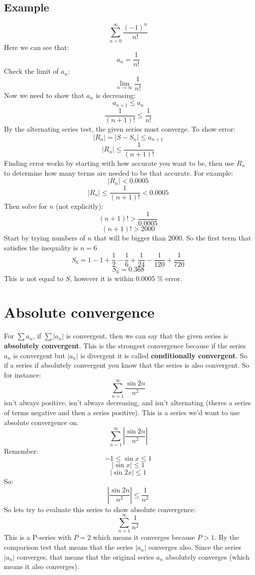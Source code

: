 \documentclass{report}
\begin{document}
    \subsection{Example}
        \[\sum_{n = 0}^{\infty} \frac{(-1)^n}{n!}\]
        Here we can see that:
        \[a_n = \frac{1}{n!}\]
        Check the limit of \(a_n\):
        \[\lim_{n \to \infty} \frac{1}{n!} \]
        Now we need to show that \(a_n\) is decreasing:
        \[a_{n+1} \leq a_n\]
        \[\frac{1}{(n+1)!} \leq \frac{1}{n!}\]
        By the alternating series test, the given series must converge. To show error:
        \[|R_n| = |S - S_n| \leq a_{n+1}\]
        \[|R_n| \leq \frac{1}{(n+1)!}\]
        Finding error works by starting with how accurate you want to be, then use \(R_n\) to determine how many terms are needed to be that accurate. For example:
        \[|R_n| < 0.0005\]
        \[|R_n| \leq \frac{1}{(n+1)!} < 0.0005\]
        Then solve for \(n\) (not explicitly):
        \[(n+1)! > \frac{1}{0.0005}\]
        \[(n+1)! > 2000\]
        Start by trying numbers of \(n\) that will be bigger than 2000. So the first term that satisfies the inequality is \(n = 6\)
        \[S_6 = 1 - 1 + \frac{1}{2} - \frac{1}{6} + \frac{1}{24} - \frac{1}{120}+ \frac{1}{720}\]
        \[S_6 = 0.368\]
        This is not equal to \(S\), however it is within 0.0005 \% error.

\section{Absolute convergence}
    For \(\sum a_n\), if \(\sum |a_n|\) is convergent, then we can say that the given series is \textbf{absolutely convergent}. This is the strongest convergence because
    if the series \(a_n\) is convergent but \(|a_n|\) is divergent it is called \textbf{conditionally convergent}. So if a series if absolutely convergent
    you know that the series is also convergent.
    So for instance:
    \[\sum_{n = 1}^{\infty} \frac{\sin 2n}{n^2}\]
    isn't always positive, isn't always decreasing, and isn't alternating (theres a series of terms negative and then a series positive).
    This is a series we'd want to use absolute convergence on.
    \[\sum_{n = 1}^{\infty} \left| \frac{\sin 2n}{n^2} \right|\]
    Remember:
    \[-1 \leq \sin x \leq 1\]
    \[| \sin x | \leq 1\]
    \[| \sin 2x | \leq 1\]
    So:
    \[\left| \frac{\sin 2n}{n^2} \right| \leq \frac{1}{n^2}\] 
    So lets try to evaluate this series to show absolute convergence:
    \[\sum_{n = 1}^{\infty} \frac{1}{n^2} \]
    This is a P-series with \(P = 2\) which means it converges because \(P > 1\).
    By the comparison test that means that the series \(|a_n|\) converges also.
    Since the series \(|a_n|\) converges, that means that the original series \(a_n\) absolutely converges (which means it also converges).
    
\end{document}
